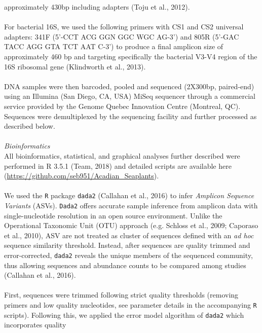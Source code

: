 \documentclass[11pt,]{article}
\begin{document}
approximately 430bp including adapters (Toju et al., 2012).\\
\hspace*{0.333em}\\
For bacterial 16S, we used the following primers with CS1 and CS2
universal adapters: 341F (5'-CCT ACG GGN GGC WGC AG-3') and 805R (5'-GAC
TACC AGG GTA TCT AAT C-3') to produce a final amplicon size of
approximately 460 bp and targeting specifically the bacterial V3-V4
region of the 16S ribosomal gene (Klindworth et al., 2013).\\
\hspace*{0.333em}\\
DNA samples were then barcoded, pooled and sequenced (2X300bp,
paired-end) using an Illumina (San Diego, CA, USA) MiSeq sequencer
through a commercial service provided by the Genome Quebec Innovation
Centre (Montreal, QC). Sequences were demultiplexed by the sequencing
facility and further processed as described below.\\
\hspace*{0.333em}\\
\emph{Bioinformatics}\\
All bioinformatics, statistical, and graphical analyses further
described were performed in R 3.5.1 (Team, 2018) and detailed scripts
are available here
(\url{https://github.com/seb951/Acadian_Seaplants}).\\
\hspace*{0.333em}\\
We used the \texttt{R} package \texttt{dada2} (Callahan et al., 2016) to
infer \emph{Amplicon Sequence Variants} (ASVs). \texttt{Dada2} offers
accurate sample inference from amplicon data with single-nucleotide
resolution in an open source environment. Unlike the Operational
Taxonomic Unit (OTU) approach (e.g. Schloss et al., 2009; Caporaso et
al., 2010), ASV are not treated as cluster of sequences defined with an
\emph{ad hoc} sequence similarity threshold. Instead, after sequences
are quality trimmed and error-corrected, \texttt{dada2} reveals the
unique members of the sequenced community, thus allowing sequences and
abundance counts to be compared among studies (Callahan et al., 2016).\\
\hspace*{0.333em}\\
First, sequences were trimmed following strict quality thresholds
(removing primers and low quality nucleotides, see parameter details in
the accompanying \texttt{R} scripts). Following this, we applied the
error model algorithm of \texttt{dada2} which incorporates quality
\end{document}
